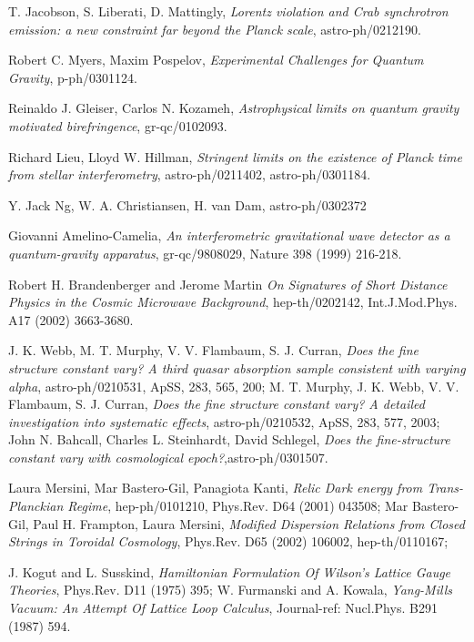 \documentclass[12pt]{article}
\begin{document}
\begin{thebibliography}{0}
{{{T. Jacobson, S. Liberati, D. Mattingly,
{\it  Lorentz violation and Crab synchrotron emission: a new constraint far 
beyond the Planck scale}, 
 astro-ph/0212190.

 Robert C. Myers, Maxim Pospelov, 
{\it  Experimental Challenges for Quantum Gravity},
p-ph/0301124.

Reinaldo J. Gleiser, Carlos N. Kozameh,
{\it Astrophysical limits on quantum gravity motivated 
birefringence}, 
gr-qc/0102093. 

Richard Lieu, Lloyd W. Hillman, 
{\it Stringent limits on the existence of Planck time from stellar interferometry},
 astro-ph/0211402, astro-ph/0301184. 
 
  Y. Jack Ng, W. A. Christiansen, H. van Dam, astro-ph/0302372

Giovanni Amelino-Camelia, {\it
 An interferometric gravitational wave detector as a quantum-gravity 
 apparatus}, gr-qc/9808029, Nature 398 (1999) 216-218.


Robert H. Brandenberger and Jerome Martin
{\it On Signatures of Short Distance Physics in the Cosmic Microwave 
Background}, hep-th/0202142, Int.J.Mod.Phys. A17 (2002) 3663-3680.


J. K. Webb, M. T. Murphy, V. V. Flambaum, S. J. Curran, 
{\it Does the fine structure constant vary? A third quasar absorption sample 
consistent with varying alpha}, astro-ph/0210531, ApSS, 283, 565, 200; 
M. T. Murphy, J. K. Webb, V. V. Flambaum, S. J. Curran, 
{\it Does the fine structure constant vary? A detailed investigation into systematic 
effects}, astro-ph/0210532, ApSS, 283, 577, 2003;
John N. Bahcall, Charles L. Steinhardt, David Schlegel, 
{\it Does the fine-structure constant vary with cosmological epoch?},astro-ph/0301507.

Laura Mersini, Mar Bastero-Gil, Panagiota Kanti,
{\it   Relic Dark energy from Trans-Planckian Regime}, 
hep-ph/0101210,  Phys.Rev. D64 (2001) 043508; 
Mar Bastero-Gil, Paul H. Frampton, Laura Mersini,
{\it  Modified Dispersion Relations from Closed Strings in Toroidal Cosmology}, 
Phys.Rev. D65 (2002) 106002, 
hep-th/0110167; 

 J. Kogut and L. Susskind, 
{\it  Hamiltonian Formulation Of Wilson's Lattice Gauge Theories}, 
 Phys.Rev. D11 (1975) 395; W. Furmanski and A. Kowala, {\it 
Yang-Mills Vacuum: An Attempt Of Lattice Loop Calculus}, 
Journal-ref: Nucl.Phys. B291 (1987) 594. 

}}}
\end{thebibliography}
\end{document}
